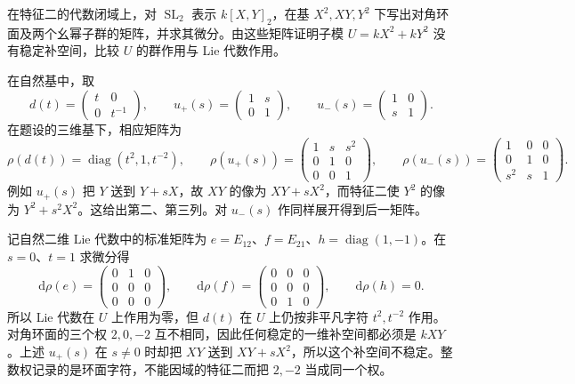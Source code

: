 \begin{optionalexercise}\label{b5:ex:22-positive-characteristic-splitting}
	在特征二的代数闭域上，对 \(\operatorname{SL}_2\) 表示 \(k[X,Y]_2\)，在基 \(X^2,XY,Y^2\) 下写出对角环面及两个幺幂子群的矩阵，并求其微分。由这些矩阵证明子模 \(U=kX^2+kY^2\) 没有稳定补空间，比较 \(U\) 的群作用与 Lie 代数作用。
\end{optionalexercise}
\begin{solution}
	在自然基中，取
	\[
		d(t)=\begin{pmatrix}t&0\\0&t^{-1}\end{pmatrix},\qquad
		u_+(s)=\begin{pmatrix}1&s\\0&1\end{pmatrix},\qquad
		u_-(s)=\begin{pmatrix}1&0\\s&1\end{pmatrix}.
	\]
	在题设的三维基下，相应矩阵为
	\[
		\rho(d(t))=\operatorname{diag}(t^2,1,t^{-2}),\qquad
		\rho(u_+(s))=\begin{pmatrix}1&s&s^2\\0&1&0\\0&0&1\end{pmatrix},\qquad
		\rho(u_-(s))=\begin{pmatrix}1&0&0\\0&1&0\\s^2&s&1\end{pmatrix}.
	\]
	例如 \(u_+(s)\) 把 \(Y\) 送到 \(Y+sX\)，故 \(XY\) 的像为 \(XY+sX^2\)，而特征二使 \(Y^2\) 的像为 \(Y^2+s^2X^2\)。这给出第二、第三列。对 \(u_-(s)\) 作同样展开得到后一矩阵。

	记自然二维 Lie 代数中的标准矩阵为 \(e=E_{12}\)、\(f=E_{21}\)、\(h=\operatorname{diag}(1,-1)\)。在 \(s=0\)、\(t=1\) 求微分得
	\[
		\mathrm{d}\rho(e)=\begin{pmatrix}0&1&0\\0&0&0\\0&0&0\end{pmatrix},\qquad
		\mathrm{d}\rho(f)=\begin{pmatrix}0&0&0\\0&0&0\\0&1&0\end{pmatrix},\qquad
		\mathrm{d}\rho(h)=0.
	\]
	所以 Lie 代数在 \(U\) 上作用为零，但 \(d(t)\) 在 \(U\) 上仍按非平凡字符 \(t^2,t^{-2}\) 作用。对角环面的三个权 \(2,0,-2\) 互不相同，因此任何稳定的一维补空间都必须是 \(kXY\)。上述 \(u_+(s)\) 在 \(s\ne0\) 时却把 \(XY\) 送到 \(XY+sX^2\)，所以这个补空间不稳定。整数权记录的是环面字符，不能因域的特征二而把 \(2,-2\) 当成同一个权。
\end{solution}


